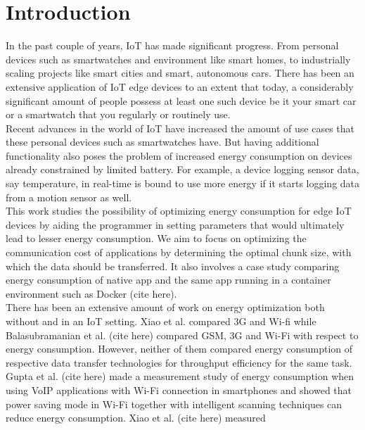 
\chapter{Introduction}\label{ch:chapter1}

In the past couple of years, IoT has made significant progress. From personal devices 
such as smartwatches and environment like smart homes, to industrially scaling projects 
like smart cities and smart, autonomous cars. There has been an extensive application of 
IoT edge devices to an extent that today, a considerably significant amount of people possess 
at least one such device \textemdash be it your smart car or a smartwatch that you regularly 
or routinely use. \\
Recent advances in the world of IoT have increased the amount of use cases that these 
personal devices such as smartwatches have. But having additional functionality also poses 
the problem of increased energy consumption on devices already constrained by limited battery. 
For example, a device logging sensor data, say temperature, in real-time is bound to use 
more energy if it starts logging data from a motion sensor as well. \\
This work studies the possibility of optimizing energy consumption for edge IoT devices 
by aiding the programmer in setting parameters that would ultimately lead to lesser energy 
consumption. We aim to focus on optimizing the communication cost of applications by determining 
the optimal chunk size, with which the data should be transferred. It also involves a case study 
comparing energy consumption of native app and the same app running in a container environment 
such as Docker (cite here). \\
There has been an extensive amount of work on energy optimization \textemdash both without 
and in an IoT setting. Xiao et al. \cite{4756414} compared 3G and Wi-fi while Balasubramanian 
et al. (cite here) compared GSM, 3G and Wi-Fi with respect to energy consumption. However, 
neither of them compared energy consumption of respective data transfer technologies 
for throughput efficiency for the same task. \\
Gupta et al. (cite here) made a measurement study of energy consumption when using VoIP applications 
with Wi-Fi connection in smartphones and showed that power saving mode in Wi-Fi together with 
intelligent scanning techniques can reduce energy consumption. Xiao et al. (cite here) measured 
